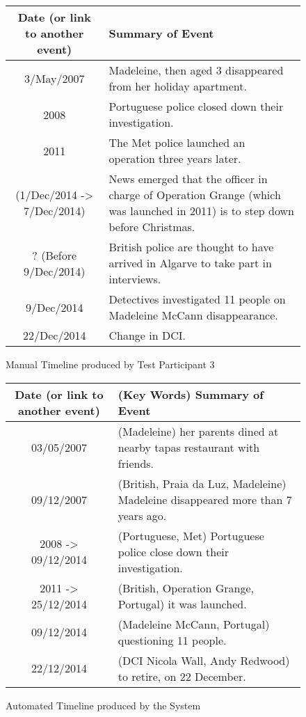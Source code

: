 \begin{figure}[H]
\begin{tabular}{|c|p{7cm}|}
\hline
Date (or link to another event) & Summary of Event\\
\hline
\hline
3/May/2007 & Madeleine, then aged 3 disappeared from her holiday apartment.\\
\hline
2008 & Portuguese police closed down their investigation.\\
\hline
2011 & The Met police launched an operation three years later.\\
\hline
(1/Dec/2014 -> 7/Dec/2014) & News emerged that the officer in charge of Operation Grange (which was launched in 2011) is to step down before Christmas.\\
\hline
? (Before 9/Dec/2014) & British police are thought to have arrived in Algarve to take part in interviews.\\
\hline
9/Dec/2014 & Detectives investigated 11 people on Madeleine McCann disappearance.\\
\hline
22/Dec/2014 & Change in DCI.\\
\hline
\end{tabular}
\caption{Manual Timeline produced by Test Participant 3}
\end{figure}

\begin{figure}[H]
\begin{tabular}{|c|p{7cm}|}
\hline
Date (or link to another event) & (Key Words) Summary of Event\\
\hline
\hline
03/05/2007 & (Madeleine) her parents dined at nearby tapas restaurant with friends.\\
\hline
09/12/2007 & (British, Praia da Luz, Madeleine) Madeleine disappeared more than 7 years ago.\\
\hline
2008 -> 09/12/2014 & (Portuguese, Met) Portuguese police close down their investigation.\\
\hline
2011 -> 25/12/2014 & (British, Operation Grange, Portugal) it was launched.\\
\hline
09/12/2014 & (Madeleine McCann, Portugal) questioning 11 people.\\
\hline
22/12/2014 & (DCI Nicola Wall, Andy Redwood) to retire, on 22 December.\\
\hline
\end{tabular}
\caption{Automated Timeline produced by the System}
\end{figure}



